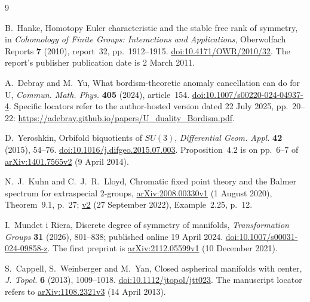 \documentclass[10pt]{article}
\begin{document}
\begin{thebibliography}{9}
\raggedright
{}
B.~Hanke, Homotopy Euler characteristic and the stable free rank of symmetry,
in \emph{Cohomology of Finite Groups: Interactions and Applications},
Oberwolfach Reports \textbf{7} (2010), report~32, pp.~1912--1915.
\href{https://doi.org/10.4171/OWR/2010/32}{doi:10.4171/OWR/2010/32}.
The report's publisher publication date is 2 March 2011.

A.~Debray and M.~Yu,
What bordism-theoretic anomaly cancellation can do for U,
\emph{Commun. Math. Phys.} \textbf{405} (2024), article~154.
\href{https://doi.org/10.1007/s00220-024-04937-4}{doi:10.1007/s00220-024-04937-4}.
Specific locators refer to the author-hosted version dated 22 July 2025,
pp.~20--22: \url{https://adebray.github.io/papers/U_duality_Bordism.pdf}.

D.~Yeroshkin, Orbifold biquotients of \(SU(3)\),
\emph{Differential Geom. Appl.} \textbf{42} (2015), 54--76.
\href{https://doi.org/10.1016/j.difgeo.2015.07.003}{doi:10.1016/j.difgeo.2015.07.003}.
Proposition~4.2 is on pp.~6--7 of
\href{https://arxiv.org/abs/1401.7565v2}{arXiv:1401.7565v2} (9 April 2014).

N.~J.~Kuhn and C.~J.~R.~Lloyd,
Chromatic fixed point theory and the Balmer spectrum for extraspecial \(2\)-groups,
\href{https://arxiv.org/abs/2008.00330v1}{arXiv:2008.00330v1}
(1 August 2020), Theorem~9.1, p.~27;
\href{https://arxiv.org/abs/2008.00330v2}{v2}
(27 September 2022), Example~2.25, p.~12.

I.~Mundet i Riera, Discrete degree of symmetry of manifolds,
\emph{Transformation Groups} \textbf{31} (2026), 801--838;
published online 19 April 2024.
\href{https://doi.org/10.1007/s00031-024-09858-z}{doi:10.1007/s00031-024-09858-z}.
The first preprint is
\href{https://arxiv.org/abs/2112.05599v1}{arXiv:2112.05599v1}
(10 December 2021).

S.~Cappell, S.~Weinberger and M.~Yan,
Closed aspherical manifolds with center,
\emph{J. Topol.} \textbf{6} (2013), 1009--1018.
\href{https://doi.org/10.1112/jtopol/jtt023}{doi:10.1112/jtopol/jtt023}.
The manuscript locator refers to
\href{https://arxiv.org/abs/1108.2321v3}{arXiv:1108.2321v3}
(14 April 2013).
\end{thebibliography}
\end{document}
